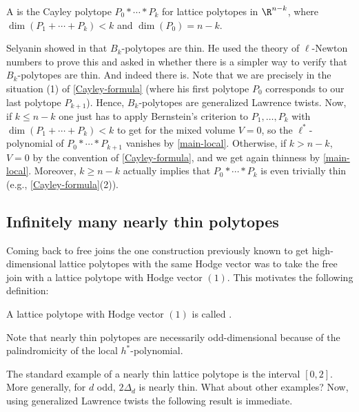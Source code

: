 \documentclass[reqno, 11pt, a4paper, oneside]{amsart}
\begin{document}
\begin{dfn}
A  is the Cayley polytope $P_0 * \cdots * P_k$ for lattice polytopes in $\R^{n-k}$, where $\dim(P_1 + \cdots + P_k) < k$ and $\dim(P_0)=n-k$.
\end{dfn}

Selyanin showed in \cite[Corollary~1.7]{selyanin2025newtonnumbersvanishingpolytopes} that $B_k$-polytopes are thin. He used the theory of $\ell$-Newton numbers to prove this and asked 
in \cite[Question~1.10]{selyanin2025newtonnumbersvanishingpolytopes} whether there is a simpler way to verify that $B_k$-polytopes are thin. And indeed there is. Note that we are precisely in the situation (1) of \cref{Cayley-formula} (where his first polytope $P_0$ corresponds to our last polytope $P_{k+1}$). 
Hence, $B_k$-polytopes are generalized Lawrence twists. Now, if $k \le n-k$ one just has to apply Bernstein's criterion \cite{bernstein_number_1975} to $P_1, \ldots, P_k$ with $\dim(P_1 + \cdots + P_k) < k$ to get for the mixed volume $V=0$, so the $\ell^*$-polynomial of $P_0 * \cdots * P_{k+1}$ vanishes by \eqref{main-local}. Otherwise, if $k > n-k$, $V=0$ by the convention of \cref{Cayley-formula}, and we get again thinness by \eqref{main-local}. Moreover, $k \ge n-k$ actually implies that $P_0 * \cdots * P_k$ is even trivially thin (e.g., \cref{Cayley-formula}(2)).

\subsection{Infinitely many nearly thin polytopes}

Coming back to free joins the one construction previously known to get high-dimensional lattice polytopes with the same Hodge vector was to take the free join with a lattice polytope with Hodge vector $(1)$. This motivates the following definition:

\begin{dfn}
    A lattice polytope with Hodge vector $(1)$ is called . 
\end{dfn}

Note that nearly thin polytopes are necessarily odd-dimensional because of the palindromicity of the local $h^*$-polynomial. 

The standard example of a nearly thin lattice polytope is the interval $[0,2]$. More generally, for $d$ odd, $2 \Delta_d$ is nearly thin. What about other examples? Now, using generalized Lawrence twists the following result is immediate.
\end{document}

